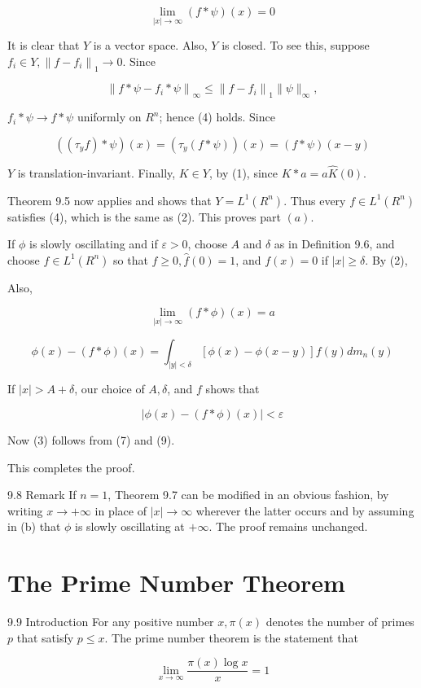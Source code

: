 \documentclass[10pt]{article}
\begin{document}
$$
\lim _{|x| \rightarrow \infty}(f * \psi)(x)=0
$$

It is clear that $Y$ is a vector space. Also, $Y$ is closed. To see this, suppose $f_{i} \in Y,\left\|f-f_{i}\right\|_{1} \rightarrow 0$. Since

$$
\left\|f * \psi-f_{i} * \psi\right\|_{\infty} \leq\left\|f-f_{i}\right\|_{1}\|\psi\|_{\infty},
$$

$f_{i} * \psi \rightarrow f * \psi$ uniformly on $R^{n}$; hence (4) holds. Since

$$
\left(\left(\tau_{y} f\right) * \psi\right)(x)=\left(\tau_{y}(f * \psi)\right)(x)=(f * \psi)(x-y)
$$

$Y$ is translation-invariant. Finally, $K \in Y$, by (1), since $K * a=a \hat{K}(0)$.

Theorem 9.5 now applies and shows that $Y=L^{1}\left(R^{n}\right)$. Thus every $f \in L^{1}\left(R^{n}\right)$ satisfies (4), which is the same as (2). This proves part $(a)$.

If $\phi$ is slowly oscillating and if $\varepsilon>0$, choose $A$ and $\delta$ as in Definition 9.6, and choose $f \in L^{1}\left(R^{n}\right)$ so that $f \geq 0, \hat{f}(0)=1$, and $f(x)=0$ if $|x| \geq \delta$. By (2),

Also,

$$
\lim _{|x| \rightarrow \infty}(f * \phi)(x)=a
$$

$$
\phi(x)-(f * \phi)(x)=\int_{|y|<\delta}[\phi(x)-\phi(x-y)] f(y) d m_{n}(y)
$$

If $|x|>A+\delta$, our choice of $A, \delta$, and $f$ shows that

$$
|\phi(x)-(f * \phi)(x)|<\varepsilon
$$

Now (3) follows from (7) and (9).

This completes the proof.

9.8 Remark If $n=1$, Theorem 9.7 can be modified in an obvious fashion, by writing $x \rightarrow+\infty$ in place of $|x| \rightarrow \infty$ wherever the latter occurs and by assuming in (b) that $\phi$ is slowly oscillating at $+\infty$. The proof remains unchanged.

\section{The Prime Number Theorem}
9.9 Introduction For any positive number $x, \pi(x)$ denotes the number of primes $p$ that satisfy $p \leq x$. The prime number theorem is the statement that

$$
\lim _{x \rightarrow \infty} \frac{\pi(x) \log x}{x}=1
$$
\end{document}
